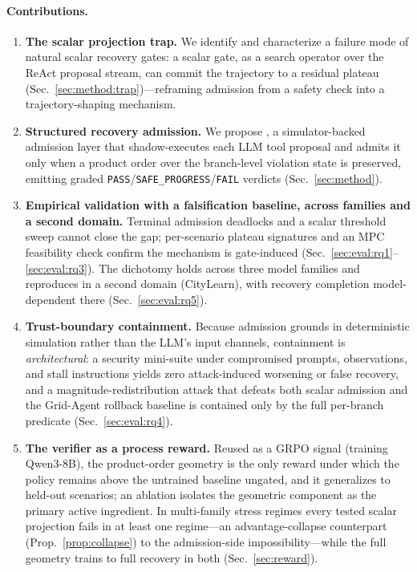 \paragraph{Contributions.}
\begin{enumerate}
\item \textbf{The scalar projection trap.} We identify and characterize a failure mode of natural scalar recovery gates: a scalar gate, as a search operator over the ReAct proposal stream, can commit the trajectory to a residual plateau (Sec.~\ref{sec:method:trap})---reframing admission from a safety check into a trajectory-shaping mechanism.
\item \textbf{Structured recovery admission.} We propose \silr{}, a simulator-backed admission layer that shadow-executes each LLM tool proposal and admits it only when a product order over the branch-level violation state is preserved, emitting graded \texttt{PASS}/\texttt{SAFE\_PROGRESS}/\texttt{FAIL} verdicts (Sec.~\ref{sec:method}).
\item \textbf{Empirical validation with a falsification baseline, across families and a second domain.} Terminal admission deadlocks and a scalar threshold sweep cannot close the gap; per-scenario plateau signatures and an MPC feasibility check confirm the mechanism is gate-induced (Sec.~\ref{sec:eval:rq1}--\ref{sec:eval:rq3}). The dichotomy holds across three model families and reproduces in a second domain (CityLearn), with recovery completion model-dependent there (Sec.~\ref{sec:eval:rq5}).
\item \textbf{Trust-boundary containment.} Because admission grounds in deterministic simulation rather than the LLM's input channels, containment is \emph{architectural}: a security mini-suite under compromised prompts, observations, and stall instructions yields zero attack-induced worsening or false recovery, and a magnitude-redistribution attack that defeats both scalar admission and the Grid-Agent rollback baseline is contained only by the full per-branch predicate (Sec.~\ref{sec:eval:rq4}).
\item \textbf{The verifier as a process reward.} Reused as a GRPO signal (training Qwen3-8B), the product-order geometry is the only reward under which the policy remains above the untrained baseline ungated, and it generalizes to held-out scenarios; an ablation isolates the geometric component as the primary active ingredient. In multi-family stress regimes every tested scalar projection fails in at least one regime---an advantage-collapse counterpart (Prop.~\ref{prop:collapse}) to the admission-side impossibility---while the full geometry trains to full recovery in both (Sec.~\ref{sec:reward}).
\end{enumerate}


